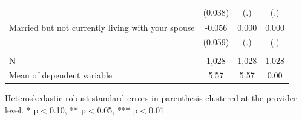 \documentclass[notes=show]{beamer}
\begin{document}
\begin{frame}[plain]
\begin{table}[htbp]
\begin{center}
\begin{threeparttable}
\begin{tabular}{l*{3}{c}}
                    									&     (0.038)   &         (.)   &         (.) \\
Married but not currently living with your spouse	&      -0.056   &       0.000   &       0.000 \\
                    									&     (0.059)   &         (.)   &         (.) \\
\\
N                   									&       1,028   &       1,028   &       1,028\\
Mean of dependent variable								&        5.57   &        5.57   &        0.00\\
\bottomrule
\end{tabular}
\begin{tablenotes}
\tiny
\item Heteroskedastic robust standard errors in parenthesis clustered at the provider level. * p$<$0.10, ** p$<$0.05, *** p$<$0.01
\end{tablenotes}
\end{threeparttable}
\end{center}
\end{table}

\end{frame}
\end{document}
